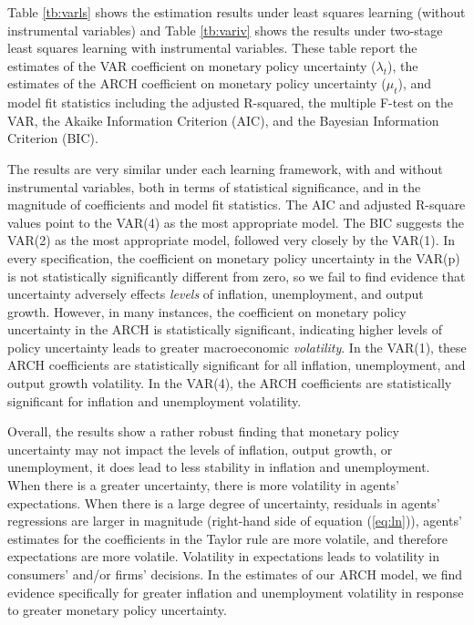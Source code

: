 \documentclass[12pt]{article}
\begin{document}
Table \ref{tb:varls} shows the estimation results under least squares learning (without instrumental variables) and Table \ref{tb:variv} shows the results under two-stage least squares learning with instrumental variables.  These table report the estimates of the VAR coefficient on monetary policy uncertainty ($\lambda_t$), the estimates of the ARCH coefficient on monetary policy uncertainty ($\mu_t$), and model fit statistics including the adjusted R-squared, the multiple F-test on the VAR, the Akaike Information Criterion (AIC), and the Bayesian Information Criterion (BIC).  

The results are very similar under each learning framework, with and without instrumental variables, both in terms of statistical significance, and in the magnitude of coefficients and model fit statistics.  The AIC and adjusted R-square values point to the VAR(4) as the most appropriate model.  The BIC suggests the VAR(2) as the most appropriate model, followed very closely by the VAR(1).  In every specification, the coefficient on monetary policy uncertainty in the VAR(p) is not statistically significantly different from zero, so we fail to find evidence that uncertainty adversely effects \textit{levels} of inflation, unemployment, and output growth.  However, in many instances, the coefficient on monetary policy uncertainty in the ARCH is statistically significant, indicating higher levels of policy uncertainty leads to greater macroeconomic \textit{volatility}.  In the VAR(1), these ARCH coefficients are statistically significant for all inflation, unemployment, and output growth volatility.  In the VAR(4), the ARCH coefficients are statistically significant for inflation and unemployment volatility.

Overall, the results show a rather robust finding that monetary policy uncertainty may not impact the levels of inflation, output growth, or unemployment, it does lead to less stability in inflation and unemployment.  When there is a greater uncertainty, there is more volatility in agents' expectations.  When there is a large degree of uncertainty, residuals in agents' regressions are larger in magnitude (right-hand side of equation (\ref{eq:ln})), agents' estimates for the coefficients in the Taylor rule are more volatile, and therefore expectations are more volatile.  Volatility in expectations leads to volatility in consumers' and/or firms' decisions.  In the estimates of our ARCH model, we find evidence specifically for greater inflation and unemployment volatility in response to greater monetary policy uncertainty. 
\end{document}
